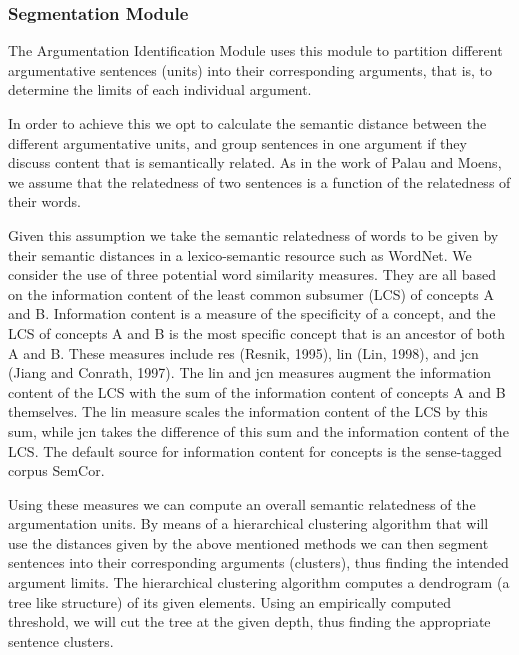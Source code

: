 \subsubsection{Segmentation Module}
\par
The Argumentation Identification Module uses this module to partition different argumentative sentences (units) into their corresponding arguments, that is, to determine the limits of each individual argument.
\par
In order to achieve this we opt to calculate the semantic distance between the different argumentative units, and group sentences in one argument if they discuss content that is semantically related. As in the work of Palau and Moens\cite{Palau}, we assume that the relatedness of two sentences is a function of the relatedness of their words.
\par
Given this assumption we take the semantic relatedness of words to be given by their semantic distances in a lexico-semantic resource such as WordNet. We consider the use of three potential word similarity measures.
They are all based on the information content of the least common subsumer (LCS)
of concepts A and B. Information content is a measure of the specificity of a concept, and the LCS of concepts A and B is the most specific concept that is an ancestor of
both A and B. These measures include res (Resnik, 1995)\cite{Resnik}, lin (Lin, 1998)\cite{lin}, and jcn (Jiang and Conrath, 1997)\cite{jcn}.
The lin and jcn measures augment the information content of the LCS with the sum of the information content
of concepts A and B themselves. The lin measure scales the information content of the LCS by this sum, while jcn takes the difference of this sum and the information content of the LCS.
The default source for information content for concepts is the sense-tagged corpus SemCor.

\par
Using these measures we can compute an overall semantic relatedness of the argumentation units. By means of a hierarchical clustering algorithm that will use the distances given by the above mentioned methods we can then segment sentences
into their corresponding arguments (clusters), thus finding the intended argument limits. The hierarchical clustering algorithm computes a dendrogram (a tree like structure) of its given elements. Using an empirically computed threshold, we will cut
the tree at the given depth, thus finding the appropriate sentence clusters.


